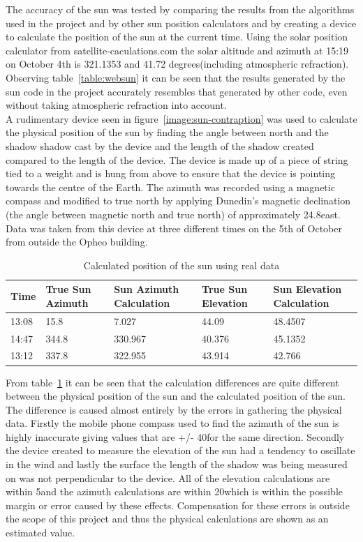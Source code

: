\documentclass[12pt]{report}
\begin{document}
The accuracy of the sun was tested by comparing the results from the algorithms used in the project and by other sun position calculators and by creating a device to calculate the position of the sun at the current time. Using the solar position calculator from satellite-caculations.com\cite{solarpos} the solar altitude and azimuth at 15:19 on October 4th is 321.1353 and 41.72 degrees(including atmospheric refraction). Observing table~\ref{table:websun} it can be seen that the results generated by the sun code in the project accurately resembles that generated by other code, even without taking atmospheric refraction into account.\\

A rudimentary device seen in figure~\ref{image:sun-contraption} was used to calculate the physical position of the sun by finding the angle between north and the shadow shadow cast by the device and the length of the shadow created compared to the length of the device. The device is made up of a piece of string tied to a weight and is hung from above to ensure that the device is pointing towards the centre of the Earth. The azimuth was recorded using a magnetic compass and modified to true north by applying Dunedin's magnetic declination (the angle between magnetic north and true north) of approximately 24.8\degree east. Data was taken from this device at three different times on the 5th of October from outside the Opheo building.\\

\begin{table}
\begin{tabular}{ | l | l | l | l | l}
\hline
Time & True Sun Azimuth & Sun Azimuth Calculation & True Sun Elevation & Sun Elevation Calculation\\ \hline
13:08 & 15.8 & 7.027 & 44.09 & 48.4507 \\ \hline
14:47 & 344.8 & 330.967 & 40.376 & 45.1352\\ \hline
13:12 & 337.8 & 322.955 & 43.914 & 42.766\\ \hline
\end{tabular}
\caption{Calculated position of the sun using real data}
\label{table:realsun}
\end{table}

From table~\ref{table:realsun} it can be seen that the calculation differences are quite different between the physical position of the sun and the calculated position of the sun. The difference is caused almost entirely by the errors in gathering the physical data. Firstly the mobile phone compass used to find the azimuth of the sun is highly inaccurate giving values that are +/- 40\degree for the same direction. Secondly the device created to measure the elevation of the sun had a tendency to oscillate in the wind and lastly the surface the length of the shadow was being measured on was not perpendicular to the device. All of the elevation calculations are within 5\degree and the azimuth calculations are within 20\degree which is within the possible margin or error caused by these effects. Compensation for these errors is outside the scope of this project and thus the physical calculations are shown as an estimated value.\\
\end{document}
